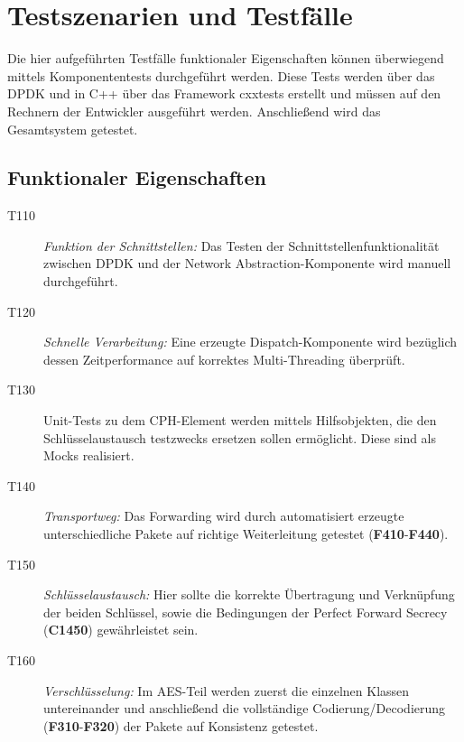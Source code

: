 \section{Testszenarien und Testfälle}


Die hier aufgeführten Testfälle funktionaler Eigenschaften können überwiegend mittels Komponententests durchgeführt werden. Diese Tests werden über das {\color{glossb}DPDK} und in C++ über das Framework {\color{glossb}cxxtests} erstellt und müssen auf den Rechnern der Entwickler ausgeführt werden. Anschließend wird das Gesamtsystem getestet.


\subsection{ Funktionaler Eigenschaften}

	\begin{description}
		\item[T110] \textit{Funktion der Schnittstellen:} Das Testen der Schnittstellenfunktionalität zwischen {\color{glossb}DPDK} und der {\color{glossb}Network Abstraction-Komponente} wird manuell durchgeführt.
		
		
		\item[T120] \textit{Schnelle Verarbeitung:} Eine erzeugte {\color{glossb}Dispatch-Komponente} wird bezüglich dessen Zeitperformance auf korrektes Multi-Threading überprüft.
		
		
		\item[T130] {\color{glossb}Unit-Tests} zu dem {\color{glossb}CPH}-Element werden mittels Hilfsobjekten, die den Schlüsselaustausch testzwecks ersetzen sollen ermöglicht. Diese sind als {\color{glossb}Mocks} realisiert.
		
		\item[T140] \textit{Transportweg:} Das Forwarding wird durch automatisiert erzeugte unterschiedliche Pakete auf richtige Weiterleitung getestet (\textbf{F410}-\textbf{F440}).
		
		
		\item[T150] \textit{Schlüsselaustausch:} Hier sollte die korrekte Übertragung und Verknüpfung der beiden Schlüssel, sowie die Bedingungen der Perfect Forward Secrecy (\textbf{C1450}) gewährleistet sein.
		
		
		\item[T160] \textit{Verschlüsselung:} Im {\color{glossb}AES}-Teil werden zuerst die einzelnen Klassen untereinander und anschließend die vollständige Codierung/Decodierung (\textbf{F310}-\textbf{F320}) der Pakete auf Konsistenz getestet. 
	\end{description}



